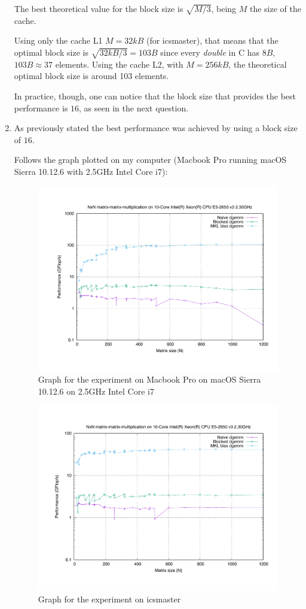 \documentclass[unicode,11pt,a4paper,oneside,numbers=endperiod,openany]{scrartcl}
\begin{document}
\begin{enumerate}
            The best theoretical value for the block size is $\sqrt{M/3}$, being $M$ the size of the cache.

            Using only the cache L1 $M = 32kB$ (for icsmaster), that means that the optimal block size is $\sqrt{32kB/3} = 103B$ since every \textit{double} in C has $8B$, $103B \approx 37$ elements.
            Using the cache L2, with $M = 256kB$, the theoretical optimal block size is around 103 elements.

            In practice, though, one can notice that the block size that provides the best performance is $16$, as seen in the next question.


        \item  %
            As previously stated the best performance was achieved by using a block size of $16$.

            Follows the graph plotted on my computer (Macbook Pro running macOS Sierra 10.12.6 with 2.5GHz Intel Core i7):

            \begin{figure}[H]
                \includegraphics[width=.8\linewidth]{timing_mac}
                \caption{Graph for the experiment on Macbook Pro on macOS Sierra 10.12.6 on 2.5GHz Intel Core i7}
            \end{figure}

            \begin{figure}[H]
                \includegraphics[width=.8\linewidth]{timing_icsmaster}
                \caption{Graph for the experiment on icsmaster}
            \end{figure}



\end{enumerate}
\end{document}
